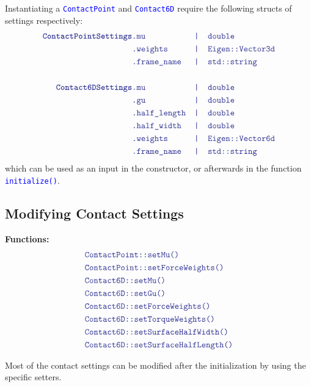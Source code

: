 \documentclass[12pt]{article}
\newcommand{\code}[2][Blue]{\textcolor{#1}{\texttt{#2}}}
\newcommand{\codebf}[2][Blue]{\textcolor{#1}{\texttt{\textbf{#2}}}}
\begin{document}
Instantiating a \code{ContactPoint} and \code{Contact6D} require the following structs of settings respectively:
%
\begin{align*}
    \codebf{ContactPointSettings}&\code{.mu} &&\code{|\quad double} \\
         &\code{.weights} &&\code{|\quad Eigen::Vector3d} \\
         &\code{.frame\_name} &&\code{|\quad std::string} \\
         \\
    \codebf{Contact6DSettings}&\code{.mu} &&\code{|\quad double} \\
    &\code{.gu} &&\code{|\quad double} \\
    &\code{.half\_length} && \code{|\quad double} \\
    &\code{.half\_width} && \code{|\quad double} \\
         &\code{.weights} &&\code{|\quad Eigen::Vector6d} \\
         &\code{.frame\_name} &&\code{|\quad std::string} 
\end{align*}
which can be used as an input in the constructor, or afterwards in the function \code{initialize()}.


\clearpage

\subsection{Modifying Contact Settings}
\hrulefill

{\bf Functions:}
    \begin{align*}
        &\code{ContactPoint::setMu()}\\
        &\code{ContactPoint::setForceWeights()}\\
        &\code{Contact6D::setMu()}\\
        &\code{Contact6D::setGu()}\\
        &\code{Contact6D::setForceWeights()}\\
        &\code{Contact6D::setTorqueWeights()}\\
        &\code{Contact6D::setSurfaceHalfWidth()}\\
        &\code{Contact6D::setSurfaceHalfLength()}\\
    \end{align*}


Most of the contact settings can be modified after the initialization by using the specific setters.


\clearpage
\end{document}
